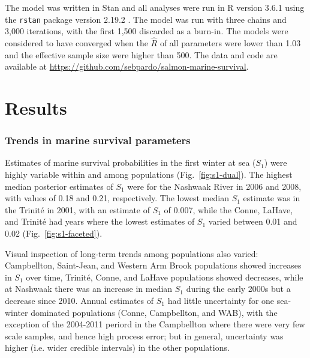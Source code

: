 \documentclass[12pt]{article}
\newcommand{\So}{$S_{1}$\xspace}
\begin{document}
The model was written in Stan \citep{Carpenter2017} and all analyses were run in R version 3.6.1
\citep{RCoreTeam2019} using the \texttt{rstan} package version 2.19.2
\citep{StanDevelopmentTeam2019}.
The model was run with three chains and 3,000 iterations, with the first 1,500
discarded as a burn-in. The models were considered to have converged when the
$\hat R$ of all parameters were lower than 1.03 and the effective sample size
were higher than 500. The data and code are available at \url{https://github.com/sebpardo/salmon-marine-survival}.



\section*{Results}


\subsubsection*{Trends in marine survival parameters}

Estimates of marine survival probabilities in the first winter at sea (\So) were
highly variable within and among populations
(Fig.~\ref{fig:s1-dual}). The highest median posterior estimates of \So
were for the Nashwaak River in 2006 and 2008, with values of 0.18 and 0.21,
respectively. The lowest median \So estimate was in the Trinit\'{e} in 2001,
with an estimate of \So of 0.007, while the Conne, LaHave, and Trinit\'{e} had
years where the lowest estimates of \So varied between 0.01 and 0.02 (Fig.~\ref{fig:s1-faceted}).

Visual inspection of long-term trends among populations also varied: Campbellton,
Saint-Jean, and Western Arm Brook populations showed increases in \So
over time, Trinit\'{e}, Conne, and LaHave populations showed decreases,
while at Nashwaak there was an increase in median \So during the early
2000s but a decrease since 2010. Annual estimates of \So had little
uncertainty for one sea-winter dominated populations (Conne, Campbellton, and
WAB), with the exception of the 2004-2011 periord in the Campbellton where
there were very few scale samples, and hence high process error; but in general,
uncertainty was higher (i.e. wider credible intervals) in the other
populations.
\end{document}
